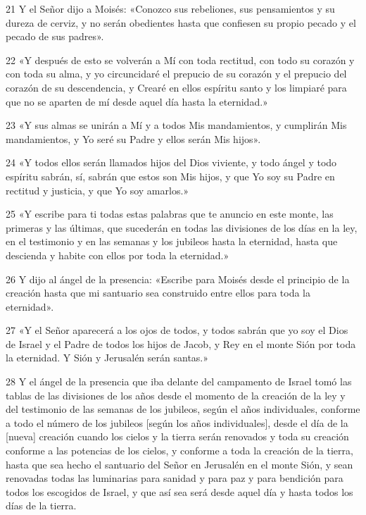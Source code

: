 \par 21 Y el Señor dijo a Moisés: «Conozco sus rebeliones, sus pensamientos y su dureza de cerviz, y no serán obedientes hasta que confiesen su propio pecado y el pecado de sus padres».
\par 22 «Y después de esto se volverán a Mí con toda rectitud, con todo su corazón y con toda su alma, y ​​yo circuncidaré el prepucio de su corazón y el prepucio del corazón de su descendencia, y Crearé en ellos espíritu santo y los limpiaré para que no se aparten de mí desde aquel día hasta la eternidad.»
\par 23 «Y sus almas se unirán a Mí y a todos Mis mandamientos, y cumplirán Mis mandamientos, y Yo seré su Padre y ellos serán Mis hijos».
\par 24 «Y todos ellos serán llamados hijos del Dios viviente, y todo ángel y todo espíritu sabrán, sí, sabrán que estos son Mis hijos, y que Yo soy su Padre en rectitud y justicia, y que Yo soy amarlos.»
\par 25 «Y escribe para ti todas estas palabras que te anuncio en este monte, las primeras y las últimas, que sucederán en todas las divisiones de los días en la ley, en el testimonio y en las semanas y los jubileos hasta la eternidad, hasta que descienda y habite con ellos por toda la eternidad.»
\par 26 Y dijo al ángel de la presencia: «Escribe para Moisés desde el principio de la creación hasta que mi santuario sea construido entre ellos para toda la eternidad».
\par 27 «Y el Señor aparecerá a los ojos de todos, y todos sabrán que yo soy el Dios de Israel y el Padre de todos los hijos de Jacob, y Rey en el monte Sión por toda la eternidad. Y Sión y Jerusalén serán santas.»
\par 28 Y el ángel de la presencia que iba delante del campamento de Israel tomó las tablas de las divisiones de los años desde el momento de la creación de la ley y del testimonio de las semanas de los jubileos, según el años individuales, conforme a todo el número de los jubileos [según los años individuales], desde el día de la [nueva] creación cuando los cielos y la tierra serán renovados y toda su creación conforme a las potencias de los cielos, y conforme a toda la creación de la tierra, hasta que sea hecho el santuario del Señor en Jerusalén en el monte Sión, y sean renovadas todas las luminarias para sanidad y para paz y para bendición para todos los escogidos de Israel, y que así sea será desde aquel día y hasta todos los días de la tierra.

